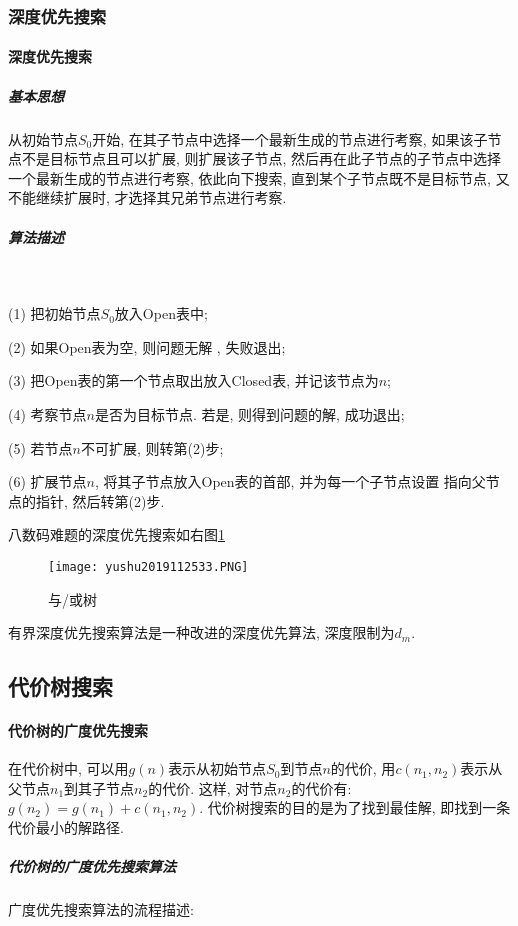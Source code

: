 \subsubsection{深度优先搜索}
\paragraph{深度优先搜索}
\subparagraph{基本思想}
从初始节点$S_0$开始, 在其子节点中选择一个最新生成的节点进行考察, 如果该子节点不是目标节点且可以扩展, 则扩展该子节点, 然后再在此子节点的子节点中选择一个最新生成的节点进行考察, 依此向下搜索, 直到某个子节点既不是目标节点, 又不能继续扩展时, 才选择其兄弟节点进行考察.
\subparagraph{算法描述}~{}

  (1) 把初始节点$S_0$放入Open表中;

  (2) 如果Open表为空, 则问题无解 , 失败退出;

  (3) 把Open表的第一个节点取出放入Closed表, 并记该节点为$n$;

  (4) 考察节点$n$是否为目标节点. 若是, 则得到问题的解, 成功退出;

  (5) 若节点$n$不可扩展, 则转第(2)步;

  (6) 扩展节点$n$, 将其子节点放入Open表的首部, 并为每一个子节点设置 指向父节点的指针, 然后转第(2)步.
\begin{example}
\end{example}

八数码难题的深度优先搜索如右图\ref{AI32fig33}
\begin{figure}[H]
\centering
\texttt{[image: yushu2019112533.PNG]}
\caption{与/或树 }
\label{AI32fig33}
\end{figure}
有界深度优先搜索算法是一种改进的深度优先算法, 深度限制为$d_m$.
\subsection{代价树搜索}
\paragraph{代价树的广度优先搜索}
    在代价树中, 可以用$g(n)$表示从初始节点$S_0$到节点$n$的代价, 用$c(n_1, n_2)$表示从父节点$n_1$到其子节点$n_2$的代价.
这样, 对节点$n_2$的代价有: $g(n_2)=g(n_1)+c(n_1, n_2)$. 代价树搜索的目的是为了找到最佳解, 即找到一条代价最小的解路径.
\subparagraph{代价树的广度优先搜索算法} 广度优先搜索算法的流程描述:

